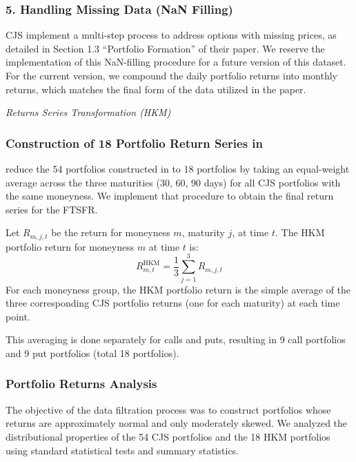 \documentclass{article}
\begin{document}
\begin{appendices}
\subsubsection*{5. Handling Missing Data (NaN Filling)}

CJS implement a multi-step process to address options with missing prices, as detailed in Section 1.3 ``Portfolio Formation'' of their paper. We reserve the implementation of this NaN-filling procedure for a future version of this dataset. For the current version, we compound the daily portfolio returns into monthly returns, which matches the final form of the data utilized in the paper.


\textit{Returns Series Transformation (HKM)}
\subsubsection*{Construction of 18 Portfolio Return Series in \citet{He2017}}

\citet{He2017} reduce the 54 portfolios constructed in \citet{Constantinides2013} to 18 portfolios by taking an equal-weight average across the three maturities (30, 60, 90 days) for all CJS portfolios with the same moneyness. We implement that procedure to obtain the final return series for the FTSFR.

Let \( R_{m,j,t} \) be the return for moneyness \( m \), maturity \( j \), at time \( t \).
The HKM portfolio return for moneyness \( m \) at time \( t \) is:
\[
R_{m,t}^{\mathrm{HKM}} = \frac{1}{3} \sum_{j=1}^{3} R_{m,j,t}
\]
For each moneyness group, the HKM portfolio return is the simple average of the three corresponding CJS portfolio returns (one for each maturity) at each time point.

This averaging is done separately for calls and puts, resulting in 9 call portfolios and 9 put portfolios (total 18 portfolios).



\subsubsection*{Portfolio Returns Analysis}

The objective of the data filtration process was to construct portfolios whose returns are approximately normal and only moderately skewed. We analyzed the distributional properties of the 54 CJS portfolios and the 18 HKM portfolios using standard statistical tests and summary statistics.


\end{appendices}
\end{document}
